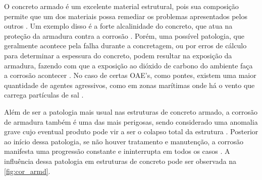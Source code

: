 O concreto armado é um excelente material estrutural, pois sua composição permite que um dos materiais possa remediar os problemas apresentados pelos outros \cite{pinheiro2010estruturas}. 
Um exemplo disso é a forte alcalinidade do concreto, que atua na proteção da armadura contra a corrosão \cite{pinheiro2010estruturas}.
Porém, uma possível patologia, que geralmente acontece pela falha durante a concretagem, ou por erros de cálculo para determinar a espessura do concreto, podem resultar na exposição da armadura, fazendo com que a exposição ao dióxido de carbono do ambiente faça a corrosão acontecer \cite{statera}. 
No caso de certas OAE's, como pontes, existem uma maior quantidade de agentes agressivos, como em zonas marítimas onde há o vento que carrega partículas de sal \cite{statera}.

Além de ser a patologia mais usual nas estruturas de concreto armado, a corrosão de armadura também é uma das mais perigosas, sendo considerado uma anomalia grave cujo eventual produto pode vir a ser o colapso total da estrutura \cite{tecnosil_2017}. 
Posterior ao início dessa patologia, se não houver tratamento e manutenção, a corrosão manifesta uma progressão constante e ininterrupta em todos os casos \cite{tecnosil_2017}.
A influência dessa patologia em estruturas de concreto pode ser observada na \autoref{fig:cor_armd}.

